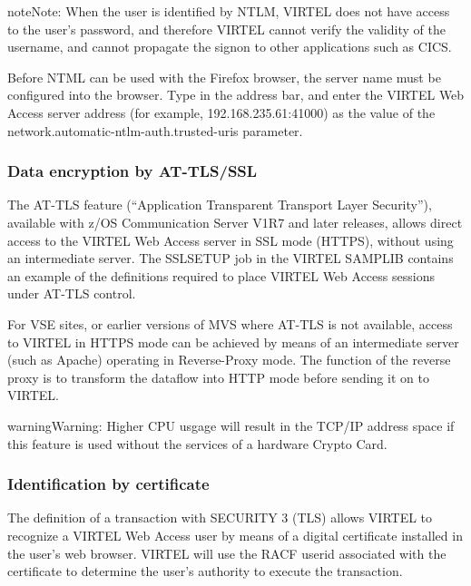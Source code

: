 \documentclass[letterpaper,10pt,english]{sphinxmanual}
\begin{document}
\begin{sphinxadmonition}{note}{Note:}
When the user is identified by NTLM, VIRTEL does not have access to the user’s password, and therefore VIRTEL
cannot verify the validity of the username, and cannot propagate the signon to other applications such as CICS.
\end{sphinxadmonition}

Before NTML can be used with the Firefox browser, the server name must be configured into the browser. Type
 in the address bar, and enter the VIRTEL Web Access server address (for example, 192.168.235.61:41000)
as the value of the network.automatic-ntlm-auth.trusted-uris parameter.


\subsubsection{Data encryption by AT-TLS/SSL}
\label{\detokenize{User_Guide:v457ug-data-encryption-ssl}}\label{\detokenize{User_Guide:data-encryption-by-at-tls-ssl}}
The AT-TLS feature (“Application Transparent Transport Layer Security”), available with z/OS Communication Server
V1R7 and later releases, allows direct access to the VIRTEL Web Access server in SSL mode (HTTPS), without using an
intermediate server. The SSLSETUP job in the VIRTEL SAMPLIB contains an example of the definitions required to place
VIRTEL Web Access sessions under AT-TLS control.

For VSE sites, or earlier versions of MVS where AT-TLS is not available, access to VIRTEL in HTTPS mode can be achieved
by means of an intermediate server (such as Apache) operating in Reverse-Proxy mode. The function of the reverse
proxy is to transform the dataflow into HTTP mode before sending it on to VIRTEL.

\begin{sphinxadmonition}{warning}{Warning:}
Higher CPU usgage will result in the TCP/IP address space if this feature is used without the services of a hardware Crypto Card.
\end{sphinxadmonition}


\subsubsection{Identification by certificate}
\label{\detokenize{User_Guide:identification-by-certificate}}
The definition of a transaction with SECURITY 3 (TLS) allows VIRTEL to recognize a VIRTEL Web Access user by means of
a digital certificate installed in the user’s web browser. VIRTEL will use the RACF userid associated with the certificate
to determine the user’s authority to execute the transaction.
\end{document}
